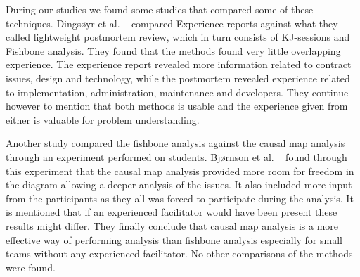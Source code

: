 \documentclass[12pt]{article}
\begin{document}
During our studies we found some studies that compared some of these techniques. Dingsøyr et al. ~\cite{Moe2001} compared Experience reports against what they called lightweight postmortem review, which in turn consists of KJ-sessions and Fishbone analysis. They found that the methods found very little overlapping experience. The experience report revealed more information related to contract issues, design and technology, while the postmortem revealed experience related to implementation, administration, maintenance and developers. They continue however to mention that both methods is usable and the experience given from either is valuable for problem understanding. 

Another study compared the fishbone analysis against the causal map analysis through an experiment performed on students. Bjørnson et al. ~\cite{Bjornson2009} found through this experiment that the causal map analysis provided more room for freedom in the diagram allowing a deeper analysis of the issues. It also included more input from the participants as they all was forced to participate during the analysis. It is mentioned that if an experienced facilitator would have been present these results might differ. They finally conclude that causal map analysis is a more effective way of performing analysis than fishbone analysis especially for small teams without any experienced facilitator. No other comparisons of the methods were found.
\end{document}
